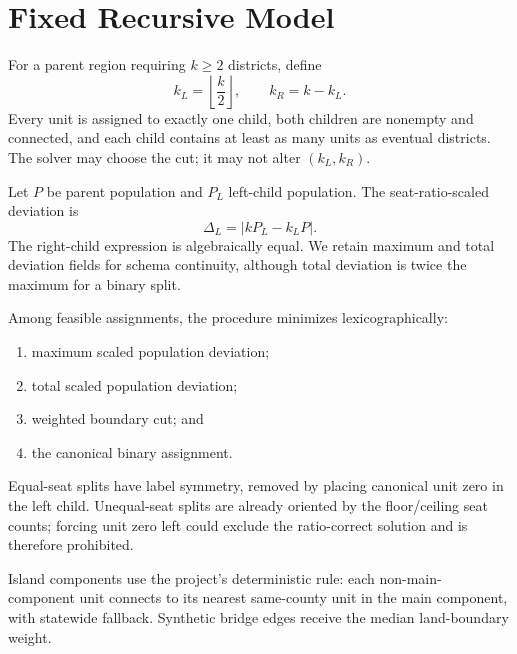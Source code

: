 \section{Fixed Recursive Model}

For a parent region requiring $k\geq2$ districts, define
\[
k_L=\left\lfloor\frac{k}{2}\right\rfloor,\qquad k_R=k-k_L.
\]
Every unit is assigned to exactly one child, both children are nonempty and
connected, and each child contains at least as many units as eventual
districts. The solver may choose the cut; it may not alter $(k_L,k_R)$.

Let $P$ be parent population and $P_L$ left-child population. The
seat-ratio-scaled deviation is
\[
\Delta_L=\left|kP_L-k_LP\right|.
\]
The right-child expression is algebraically equal. We retain maximum and total
deviation fields for schema continuity, although total deviation is twice the
maximum for a binary split.

Among feasible assignments, the procedure minimizes lexicographically:
\begin{enumerate}[label=(\arabic*)]
  \item maximum scaled population deviation;
  \item total scaled population deviation;
  \item weighted boundary cut; and
  \item the canonical binary assignment.
\end{enumerate}

Equal-seat splits have label symmetry, removed by placing canonical unit zero
in the left child. Unequal-seat splits are already oriented by the floor/ceiling
seat counts; forcing unit zero left could exclude the ratio-correct solution
and is therefore prohibited.

Island components use the project's deterministic rule: each non-main-
component unit connects to its nearest same-county unit in the main component,
with statewide fallback. Synthetic bridge edges receive the median
land-boundary weight.
